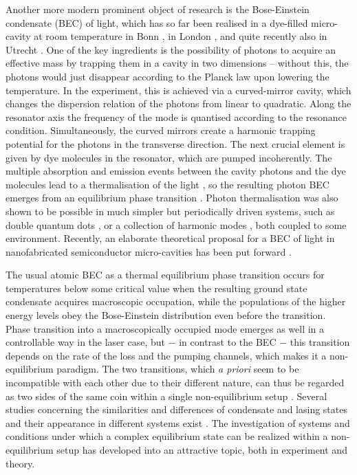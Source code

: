 \documentclass[12pt, a4paper]{iopart}
\begin{document}
Another more modern prominent object of research is the Bose-Einstein condensate (BEC) of light, which has so far been realised in a dye-filled micro-cavity at room temperature
in Bonn \cite{Klaers_BEC_of_photons}, in London \cite{Marelic_Photon_BEC_London}, and quite recently also in Utrecht \cite{NewOosten_1}. One of the key ingredients is the possibility of photons to acquire an effective mass by trapping them in a cavity in two dimensions -- without this, the photons would just disappear  according to the Planck law upon lowering the temperature. In the experiment, this is achieved via a curved-mirror cavity, which changes the dispersion relation of the photons from linear to quadratic. Along the resonator axis the frequency of the mode is quantised according to the resonance condition. Simultaneously, the curved mirrors create a harmonic trapping potential for the photons in the transverse direction. The next crucial element is given by dye molecules in the resonator, which are pumped incoherently. The multiple absorption and emission events between the cavity photons and the dye molecules lead to a thermalisation of the light \cite{Weitz-Thermalization}, so the resulting photon BEC emerges from an equilibrium phase transition \cite{FieldTheory,PhaseT-Critic_Properties_of_phi4_theory-Kleinert,PhaseT-renorm_group-zinn_justin}. Photon thermalisation was also shown to be possible in much simpler but periodically driven systems,  such as double quantum dots \cite{Gulans_thermalilzation_photons_double_qd_drive}, or a collection of harmonic modes \cite{Hafezi-chem_potential_for_light}, both coupled to some environment. {Recently, an elaborate theoretical proposal for a BEC of light in nanofabricated semiconductor micro-cavities has been put forward \cite{Stoof_Semiconductor_microcavities}.}

The usual atomic BEC as a thermal equilibrium phase transition occurs for temperatures below some critical value \cite{Pitaevskii-BEC,Pethick-Smith} {when the resulting ground state condensate acquires macroscopic occupation, while the populations of the higher energy levels obey the Bose-Einstein distribution even before the transition. Phase transition into a macroscopically occupied mode emerges as well in a controllable way in the laser case, but $-$ in contrast to the BEC $-$ this transition depends on the rate of the loss and the pumping channels, which makes it a non-equilibrium paradigm.} The two transitions, which {\it a priori} seem to be incompatible with each other due to their different nature, can thus be regarded as two sides of the same coin within a single non-equilibrium setup \cite{PhotonBEC-Thermalization_kinetics-Weitz}. Several studies concerning the similarities and differences of condensate and lasing states and their appearance in different systems exist
\cite{Bajoni-photon_lasing_similarities_with_condensate,Fischer_laser-and-bec-statistical_mechanic,Chioccetta-Laser_and_BEC-analog_and_diff,Leymann_Mode_Switching,Nyman_Small_phBEC,Nyman_Few_photon_BEC}. The investigation of systems and conditions under which a complex equilibrium state can be realized within a non-equilibrium setup has developed into an attractive topic, both in experiment and theory.
\end{document}
